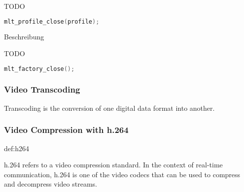 \documentclass[../MasterThesis.tex]{subfiles}
\begin{document}
\begin{description}[font=\normalfont\color{RedViolet!80!black}, style=nextline]
	TODO
	
	\begin{lstlisting}[language=C, numbers=none, basicstyle=\scriptsize\ttfamily]
	mlt_profile_close(profile); \end{lstlisting}
	
	
	
	\item[Close the factory] Beschreibung
	
	TODO
	
	\begin{lstlisting}[language=C, numbers=none, basicstyle=\scriptsize\ttfamily]
	mlt_factory_close();
	\end{lstlisting}
	
	
\end{description}












\newpage
\subsubsection*{Video Transcoding} 

Transcoding is the conversion of one digital data format into another.~\cite{transcoding}







\subsubsection*{Video Compression with h.264} 

\begin{CountingDefinition}[h.264]{def:h264}
	
	h.264 refers to a video compression standard. In the context of real-time communication, h.264 is one of the video codecs that can be used to compress and decompress video streams.
	
\end{CountingDefinition}
\end{document}

